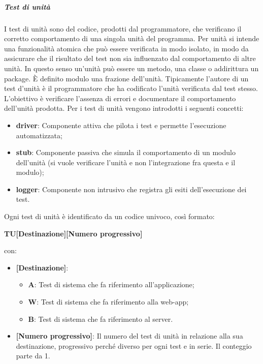 \subparagraph*{Test di unità} 
I test di unità sono del codice, prodotti dal programmatore, che verificano il corretto comportamento di una singola unità del programma.
Per unità si intende una funzionalità atomica che può essere verificata in modo isolato, in modo da assicurare che il risultato del test non sia influenzato dal comportamento di altre unità. In questo senso un'unità può essere un metodo, una classe o addirittura un package.
È definito modulo una frazione dell'unità.
Tipicamente l'autore di un test d'unità è il programmatore che ha codificato l'unità verificata dal test stesso.
L'obiettivo è verificare l’assenza di errori e documentare il comportamento dell’unità prodotta.
Per i test di unità vengono introdotti i seguenti concetti:
\begin{itemize}
    \item \textbf{driver}: Componente attiva che pilota i test e permette l'esecuzione automatizzata;
    \item \textbf{stub}: Componente passiva che simula il comportamento di un modulo dell'unità (si vuole verificare l'unità e non l'integrazione fra questa e il modulo);
    \item \textbf{logger}: Componente non intrusivo che registra gli esiti dell'esecuzione dei test.
\end{itemize}
Ogni test di unità è identificato da un codice univoco, così formato:
\begin{center}
	\item \textbf{TU[Destinazione][Numero progressivo]}
\end{center}
con:
\begin{itemize}
	\item \textbf{[Destinazione]}:
	\begin{itemize}
		\item \textbf{A}: Test di sistema che fa riferimento all'applicazione;
		\item \textbf{W}: Test di sistema che fa riferimento alla web-app;
		\item \textbf{B}: Test di sistema che fa riferimento al server.
	\end{itemize}
	\item \textbf{[Numero progressivo]}: Il numero del test di unità in relazione alla sua destinazione, progressivo perché diverso per ogni test e in serie. Il conteggio parte da 1.
\end{itemize}

